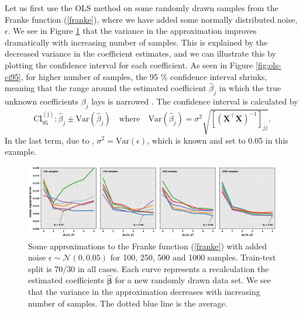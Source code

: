 \documentclass[]{article}
\begin{document}
Let us first use the OLS method on some randomly drawn samples from the Franke function (\ref{franke}), where we have added some normally distributed noise, $\epsilon$. We see in Figure \ref{fig:ols-simple-varying-n} that the variance in the approximation improves dramatically with increasing number of samples. This is explained by the decreased variance in the coefficient estimates, and we can illustrate this by plotting the confidence interval for each coefficient. As seen in Figure \ref{fig:ols-ci95}, for higher number of samples, the 95 \% confidence interval shrinks, meaning that the range around the estimated coefficient $\hat\beta_j$ in which the true unknown coefficients $\beta_j$ lays is narrowed \cite{james2013introduction}. The confidence interval is calculated by
\begin{equation}
\label{ci}
	\mathrm{CI_{95}^{(j)}}: \hat{\beta}_j \pm \mathrm{Var}(\hat{\beta}_j) \quad \text{where} \quad \mathrm{Var}(\hat{\beta}_j) = \sigma^2\sqrt{[(\mathbf{X}^\intercal \mathbf{X})^{-1}]_{jj}}.
\end{equation}
In the last term, due to \cite{fys-stk4155-notes}, $\sigma^2 = \mathrm{Var}(\epsilon)$, which is known and set to 0.05 in this example.

\begin{figure}[!htb]
	\centering
	\includegraphics[width=1\linewidth]{./results/ols-simple-varying-n.png}
	\caption{Some approximations to the Franke function (\ref{franke}) with added noise $\epsilon  \sim \mathcal{N}(0, 0.05)$ for 100, 250, 500 and 1000 samples. Train-test split is 70/30 in all cases. Each curve represents a recalculation the estimated coefficients $\mathbf{\hat{\beta}}$ for a new randomly drawn data set. We see that the variance in the approximation decreases with increasing number of samples. The dotted blue line is the average.}
	\label{fig:ols-simple-varying-n}
\end{figure}
\end{document}
